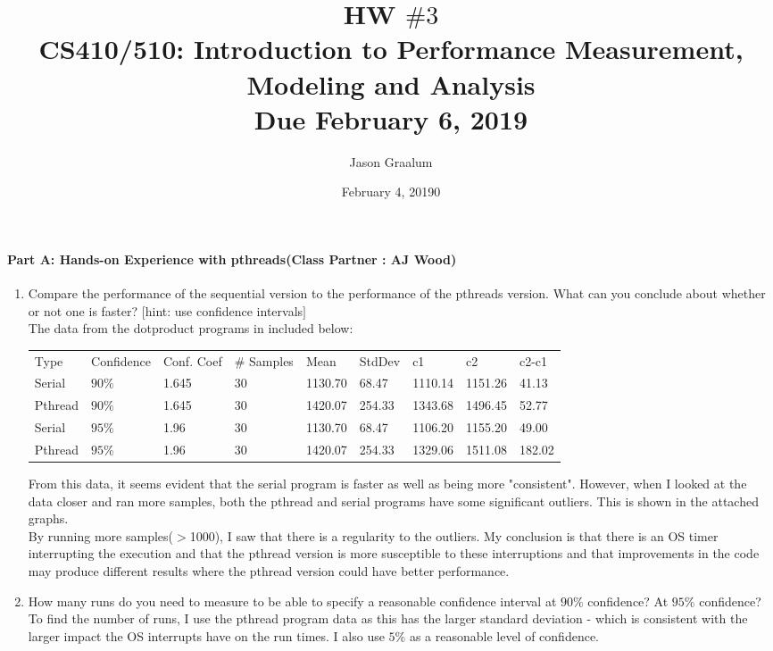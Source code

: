 \documentclass[11pt]{article}
\title{\bf HW $\#3$ \\[2ex]
\rm\normalsize CS410/510: Introduction to Performance Measurement, Modeling and Analysis \\ Due February 6, 2019}
\date{February 4, 20190}
\author{Jason Graalum}
\begin{document}
\maketitle

\paragraph{Part A: Hands-on Experience with pthreads(Class Partner : AJ Wood)} 
\begin{enumerate}[(1)]
\item Compare the performance of the sequential version to the performance of the pthreads version. What can you conclude about whether or not one is faster? $[$hint: use confidence intervals$]$\\
The data from the dotproduct programs in included below:\\
\begin{table}[H]
\begin{tabular}{ l  l  l  l  l  l  l  l  l }
Type      & Confidence&	Conf. Coef&	$\#$ Samples	&Mean&	StdDev&	c1&	c2&	c2-c1 \\
Serial     &	$90\%$	& 1.645 & 30& 1130.70 &   68.47 &  1110.14 & 1151.26 & 41.13\\
Pthread	 & $90\%$    & 1.645 & 30& 1420.07 & 254.33 & 1343.68 & 1496.45 &	 52.77\\
Serial     &	$95\%$    & 1.96   & 30& 1130.70 &    68.47 & 1106.20 & 1155.20 & 49.00\\
Pthread	 &$95\%$	    & 1.96   & 30& 1420.07 & 254.33 &1329.06 & 1511.08 & 182.02\\
\end{tabular}
\end{table}
From this data, it seems evident that the serial program is faster as well as being more "consistent".  However, when I looked at the data closer and ran more samples, both the pthread and serial programs have some significant outliers.  This is shown in the attached graphs. \\ 
By running more samples($>$1000), I saw that there is a regularity to the outliers. My conclusion is that there is an OS timer interrupting the execution and that the pthread version is more susceptible to these interruptions and that improvements in the code may produce different results where the pthread version could have better performance.


\item How many runs do you need to measure to be able to specify a reasonable confidence interval at $90\%$ confidence? At $95\%$ confidence?\\
To find the number of runs, I use the pthread program data as this has the larger standard deviation - which is consistent with the larger impact the OS interrupts have on the run times. I also use $5\%$ as a reasonable level of confidence.\\


\end{enumerate}
\end{document}
